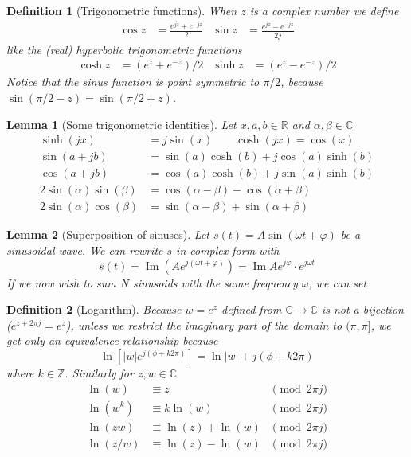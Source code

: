 \documentclass[twocolumn, margin=small]{tex/hsrzf}
\newcommand\Zset{\mathbb{Z}}
\newcommand\Rset{\mathbb{R}}
\newcommand\Cset{\mathbb{C}}
\newcommand\len[1]{\lvert#1\rvert}
\renewcommand\Im{\operatorname{Im}}
\theoremstyle{komfourzf}
\newtheorem{definition}{Definition}
\newtheorem{lemma}{Lemma}
\begin{document}
\begin{definition}[Trigonometric functions]
  When \(z\) is a complex number we define
  \begin{align*}
    \cos z &= \frac{e^{jz} + e^{-jz}}{2} &
    \sin z &= \frac{e^{jz} - e^{-jz}}{2j}
  \end{align*}
  like the (real) hyperbolic trigonometric functions
  \begin{align*}
    \cosh z &= \left( e^z + e^{-z} \right)/2 &
    \sinh z &= \left( e^z - e^{-z} \right)/2
  \end{align*}
  Notice that the sinus function is point symmetric to \(\pi/2\), because \(\sin(\pi/2 - z) = \sin(\pi/2 + z)\).
\end{definition}

\begin{lemma}[Some trigonometric identities] Let \(x,a,b \in\Rset\) and \(\alpha,\beta \in\Cset\)
  \begin{align*}
    \sinh(jx) &= j\sin(x) \qquad \cosh(jx) = \cos(x) \\
    \sin(a + jb) &= \sin(a)\cosh(b) + j\cos(a)\sinh(b) \\
    \cos(a + jb) &= \cos(a)\cosh(b) + j\sin(a)\sinh(b) \\
    2\sin(\alpha)\sin(\beta) &= \cos(\alpha - \beta) - \cos(\alpha + \beta) \\
    2\sin(\alpha)\cos(\beta) &= \sin(\alpha - \beta) + \sin(\alpha + \beta)
  \end{align*}
\end{lemma}

\begin{lemma}[Superposition of sinuses]
  Let \(s(t) = A\sin(\omega t + \varphi)\) be a sinusoidal wave.
  We can rewrite \(s\) in complex form with
  \[
    s(t) = \Im\left(Ae^{j(\omega t + \varphi)}\right) = \Im
      Ae^{j\varphi}\cdot e^{j\omega t}
  \]
  If we now wish to sum \(N\) sinusoids with the same frequency \(\omega\), we can set
\end{lemma}

\begin{definition}[Logarithm]
  Because \(w = e^z\) defined from \(\Cset \to \Cset\) is not a bijection (\(e^{z + 2\pi j} = e^z\)), unless we restrict the imaginary part of the domain to \((\pi, \pi]\), we get only an equivalence relationship because
  \[
    \ln\left[\len{w} e^{j(\phi + k2\pi)}\right] = \ln\len{w} + j(\phi + k2\pi)
  \]
  where \(k \in\Zset\). Similarly for \(z,w\in\Cset\)
  \begin{align*}
    \ln(w) &\equiv z &\pmod{2\pi j} \\
    \ln(w^k) &\equiv k\ln(w) &\pmod{2\pi j} \\
    \ln(zw) &\equiv \ln(z) + \ln(w) &\pmod{2\pi j} \\
    \ln(z/w) &\equiv \ln(z) - \ln(w) &\pmod{2\pi j}
  \end{align*}
\end{definition}
\end{document}
